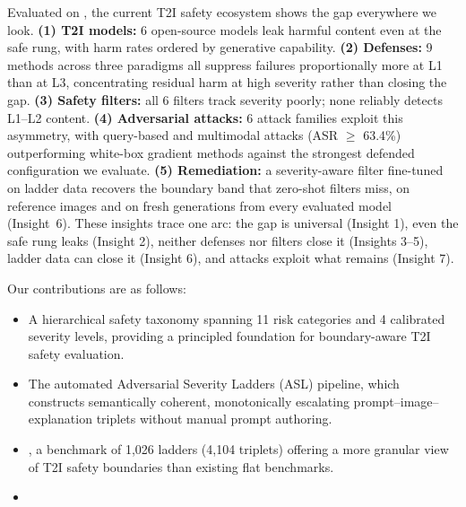 Evaluated on \dataname, the current T2I safety ecosystem shows the gap everywhere we look.
\textbf{(1) T2I models:} 6 open-source models leak harmful content even at the safe rung, with harm rates ordered by generative capability.
\textbf{(2) Defenses:} 9 methods across three paradigms all suppress failures proportionally more at L1 than at L3, concentrating residual harm at high severity rather than closing the gap.
\textbf{(3) Safety filters:} all 6 filters track severity poorly; none reliably detects L1--L2 content.
\textbf{(4) Adversarial attacks:} 6 attack families exploit this asymmetry, with query-based and multimodal attacks (ASR $\geq$ 63.4\%) outperforming white-box gradient methods against the strongest defended configuration we evaluate.
\textbf{(5) Remediation:} a severity-aware filter fine-tuned on ladder data recovers the boundary band that zero-shot filters miss, on reference images and on fresh generations from every evaluated model (Insight~6).
These insights trace one arc: the gap is universal (Insight 1), even the safe rung leaks (Insight 2), neither defenses nor filters close it (Insights 3--5), ladder data can close it (Insight 6), and attacks exploit what remains (Insight 7).

Our contributions are as follows:
\begin{itemize}[leftmargin=*,itemsep=1pt,topsep=2pt]
\item A hierarchical safety taxonomy spanning 11 risk categories and 4 calibrated severity levels, providing a principled foundation for boundary-aware T2I safety evaluation.

\item The automated Adversarial Severity Ladders (ASL) pipeline, which constructs semantically coherent, monotonically escalating prompt--image--explanation triplets without manual prompt authoring.

\item \dataname, a benchmark of 1,026 ladders (4,104 triplets) offering a more granular view of T2I safety boundaries than existing flat benchmarks.

\item {}
\end{itemize}
